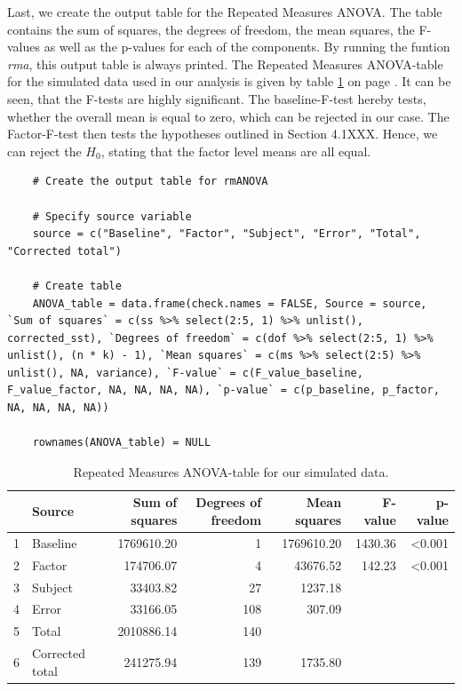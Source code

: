 \documentclass[11pt]{article}
\begin{document}
	Last, we create the output table for the Repeated Measures ANOVA. The table contains the sum of squares, the degrees of freedom, the mean squares, the F-values as well as the p-values for each of the components. By running the funtion \textit{rma}, this output table is always printed. The Repeated Measures ANOVA-table for the simulated data used in our analysis is given by table \ref{table:outputtable1} on page \pageref{table:outputtable1}. It can be seen, that the F-tests are highly significant. The baseline-F-test hereby tests, whether the overall mean is equal to zero, which can be rejected in our case. The Factor-F-test then tests the hypotheses outlined in Section 4.1XXX. Hence, we can reject the $H_{0}$, stating that the factor level means are all equal.\\
	
	\begin{lstlisting}   
	# Create the output table for rmANOVA
	
	# Specify source variable
	source = c("Baseline", "Factor", "Subject", "Error", "Total", "Corrected total")
	
	# Create table
	ANOVA_table = data.frame(check.names = FALSE, Source = source, `Sum of squares` = c(ss %>% select(2:5, 1) %>% unlist(), corrected_sst), `Degrees of freedom` = c(dof %>% select(2:5, 1) %>% unlist(), (n * k) - 1), `Mean squares` = c(ms %>% select(2:5) %>% unlist(), NA, variance), `F-value` = c(F_value_baseline, F_value_factor, NA, NA, NA, NA), `p-value` = c(p_baseline, p_factor, NA, NA, NA, NA))
	
	rownames(ANOVA_table) = NULL
	\end{lstlisting}   
	
	\begin{table}[ht]
		\centering
		\begin{tabular}{rlrrrrr}
			\hline
			& Source & Sum of squares & Degrees of freedom & Mean squares & F-value & p-value \\ 
			\hline
			1 & Baseline & 1769610.20 & 1 & 1769610.20 & 1430.36 & <0.001 \\ 
			2 & Factor & 174706.07 & 4 & 43676.52 & 142.23 & <0.001 \\ 
			3 & Subject & 33403.82 & 27 & 1237.18 &  &  \\ 
			4 & Error & 33166.05 & 108 & 307.09 &  &  \\ 
			5 & Total & 2010886.14 & 140 &  &  &  \\ 
			6 & Corrected total & 241275.94 & 139 & 1735.80 &  &  \\ 
			\hline
		\end{tabular}
		\caption{Repeated Measures ANOVA-table for our simulated data.}\label{table:outputtable1}
	\end{table}
	
\end{document}
